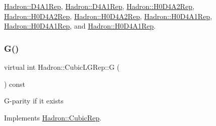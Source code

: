 \mbox{\hyperlink{structHadron_1_1D4A1Rep_a4224f0d47cc0a894a9da4c8505d51c29}{Hadron\+::\+D4\+A1\+Rep}}, \mbox{\hyperlink{structHadron_1_1D4A1Rep_a4224f0d47cc0a894a9da4c8505d51c29}{Hadron\+::\+D4\+A1\+Rep}}, \mbox{\hyperlink{structHadron_1_1H0D4A2Rep_a637522dc6caee2869b2bb632a4c5a5b5}{Hadron\+::\+H0\+D4\+A2\+Rep}}, \mbox{\hyperlink{structHadron_1_1H0D4A2Rep_a637522dc6caee2869b2bb632a4c5a5b5}{Hadron\+::\+H0\+D4\+A2\+Rep}}, \mbox{\hyperlink{structHadron_1_1H0D4A2Rep_a637522dc6caee2869b2bb632a4c5a5b5}{Hadron\+::\+H0\+D4\+A2\+Rep}}, \mbox{\hyperlink{structHadron_1_1H0D4A1Rep_ab13ff026da1bc59df4b52835038296d5}{Hadron\+::\+H0\+D4\+A1\+Rep}}, \mbox{\hyperlink{structHadron_1_1H0D4A1Rep_ab13ff026da1bc59df4b52835038296d5}{Hadron\+::\+H0\+D4\+A1\+Rep}}, and \mbox{\hyperlink{structHadron_1_1H0D4A1Rep_ab13ff026da1bc59df4b52835038296d5}{Hadron\+::\+H0\+D4\+A1\+Rep}}.

\mbox{\label{structHadron_1_1CubicLGRep_ace26f7b2d55e3a668a14cb9026da5231}} 
\subsubsection{\texorpdfstring{G()}{G()}\hspace{0.1cm}{\footnotesize\ttfamily [3/3]}}
{\footnotesize\ttfamily virtual int Hadron\+::\+Cubic\+L\+G\+Rep\+::G (\begin{DoxyParamCaption}{ }\end{DoxyParamCaption}) const\hspace{0.3cm}{\ttfamily [pure virtual]}}

G-\/parity if it exists 

Implements \mbox{\hyperlink{structHadron_1_1CubicRep_a52104e43266d1614c00bbd1c3b395458}{Hadron\+::\+Cubic\+Rep}}.



